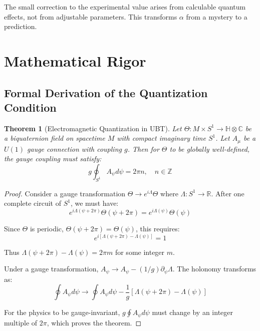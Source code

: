 \documentclass[12pt, a4paper]{article}
\newtheorem{theorem}{Theorem}
\theoremstyle{definition}
\theoremstyle{remark}
\begin{document}
The small correction to the experimental value arises from calculable quantum effects, not from adjustable parameters. This transforms $\alpha$ from a mystery to a prediction.

\section{Mathematical Rigor}

\subsection{Formal Derivation of the Quantization Condition}

\begin{theorem}[Electromagnetic Quantization in UBT]
Let $\Theta: M \times S^1 \to \mathbb{H} \otimes \mathbb{C}$ be a biquaternion field on spacetime $M$ with compact imaginary time $S^1$. Let $A_\mu$ be a $U(1)$ gauge connection with coupling $g$. Then for $\Theta$ to be globally well-defined, the gauge coupling must satisfy:
\begin{equation}
g \oint_{S^1} A_\psi d\psi = 2\pi n, \quad n \in \mathbb{Z}
\end{equation}
\end{theorem}

\begin{proof}
Consider a gauge transformation $\Theta \to e^{i\Lambda}\Theta$ where $\Lambda: S^1 \to \mathbb{R}$. After one complete circuit of $S^1$, we must have:
\begin{equation}
e^{i\Lambda(\psi + 2\pi)} \Theta(\psi + 2\pi) = e^{i\Lambda(\psi)} \Theta(\psi)
\end{equation}

Since $\Theta$ is periodic, $\Theta(\psi + 2\pi) = \Theta(\psi)$, this requires:
\begin{equation}
e^{i[\Lambda(\psi + 2\pi) - \Lambda(\psi)]} = 1
\end{equation}

Thus $\Lambda(\psi + 2\pi) - \Lambda(\psi) = 2\pi m$ for some integer $m$.

Under a gauge transformation, $A_\psi \to A_\psi - (1/g)\partial_\psi \Lambda$. The holonomy transforms as:
\begin{equation}
\oint A_\psi d\psi \to \oint A_\psi d\psi - \frac{1}{g}[\Lambda(\psi + 2\pi) - \Lambda(\psi)]
\end{equation}

For the physics to be gauge-invariant, $g \oint A_\psi d\psi$ must change by an integer multiple of $2\pi$, which proves the theorem.
\end{proof}
\end{document}
